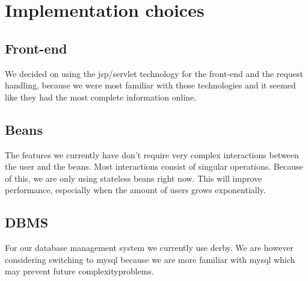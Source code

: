\documentclass{article}
\begin{document}
\section{Implementation choices}
\subsection{Front-end}
We decided on using the jsp/servlet technology for the front-end and the request handling, because we were most familiar with those technologies and it seemed like they had the most complete information online.

\subsection{Beans}
The features we currently have don't require very complex interactions between the user and the beans. Most interactions consist of singular operations. Because of this, we are only using stateless beans right now. This will improve performance, especially when the amount of users grows exponentially.
\subsection{DBMS}
For our database management system we currently use derby. We are however considering switching to mysql because we are more familiar with mysql which may prevent future complexityproblems.
\end{document}
